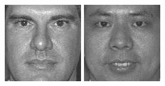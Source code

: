 \begin{figure}[ht]
\begin{center}
  \includegraphics[width=\columnwidth/10]{ch5/figures/feret15.jpg}
  \includegraphics[width=\columnwidth/10]{ch5/figures/feret16.jpg}

\end{center}
\end{figure}

